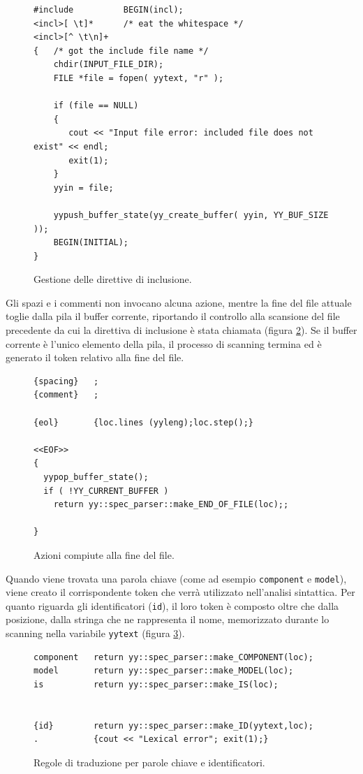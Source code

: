 \begin{figure}[htbp]
\begin{verbatim}
#include          BEGIN(incl);
<incl>[ \t]*      /* eat the whitespace */
<incl>[^ \t\n]+   
{   /* got the include file name */
    chdir(INPUT_FILE_DIR);
    FILE *file = fopen( yytext, "r" );

    if (file == NULL)
    {
       cout << "Input file error: included file does not exist" << endl;
       exit(1);
    }
    yyin = file;

    yypush_buffer_state(yy_create_buffer( yyin, YY_BUF_SIZE ));
    BEGIN(INITIAL);
}
\end{verbatim}
\caption{Gestione delle direttive di inclusione.}
\label{code:lex_rules}
\end{figure}

Gli spazi e i commenti non invocano alcuna azione, mentre la fine del file attuale toglie dalla pila il buffer corrente, riportando il controllo alla scansione del file precedente da cui la direttiva di inclusione è stata chiamata (figura \ref{code:lex_buff}). Se il buffer corrente è l'unico elemento della pila, il processo di scanning termina ed è generato il token relativo alla fine del file.

\begin{figure}[htbp]
\begin{verbatim}
{spacing}	;
{comment}   ;

{eol}		{loc.lines (yyleng);loc.step();}

<<EOF>>    
{
  yypop_buffer_state();
  if ( !YY_CURRENT_BUFFER )
    return yy::spec_parser::make_END_OF_FILE(loc);;
  
}
\end{verbatim}
\caption{Azioni compiute alla fine del file.}
\label{code:lex_buff}
\end{figure}

Quando viene trovata una parola chiave (come ad esempio \verb|component| e \verb|model|), viene creato il corrispondente token che verrà utilizzato nell'analisi sintattica.
Per quanto riguarda gli identificatori (\verb|id|), il loro token è composto oltre che dalla posizione, dalla stringa che ne rappresenta il nome, memorizzato durante lo scanning nella variabile \verb|yytext| (figura \ref{code:lex_id}).

\begin{figure}[htbp]
\begin{verbatim}
component   return yy::spec_parser::make_COMPONENT(loc);
model       return yy::spec_parser::make_MODEL(loc);
is          return yy::spec_parser::make_IS(loc);


{id}        return yy::spec_parser::make_ID(yytext,loc);
.		    {cout << "Lexical error"; exit(1);}
\end{verbatim}
\caption{Regole di traduzione per parole chiave e identificatori.}
\label{code:lex_id}
\end{figure}

